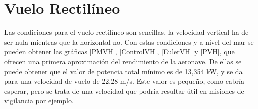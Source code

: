 \thispagestyle{empty}
\chapter{Vuelo Rectilíneo}

Las condiciones para el vuelo rectilíneo son sencillas, la velocidad vertical ha de ser nula mientras que la horizontal no. Con estas condiciones y a nivel del mar se pueden obtener las gráficas \ref{PMVH}, \ref{ControlVH}, \ref{EulerVH} y \ref{PVH}, que ofrecen una primera aproximación del rendimiento de la aeronave. De ellas se puede obtener que el valor de potencia total mínimo es de 13,354 kW, y se da para una velocidad de vuelo de 22,28 m/s. Este valor es pequeño, como cabría esperar, pero se trata de una velocidad que podría resultar útil en misiones de vigilancia por ejemplo.

